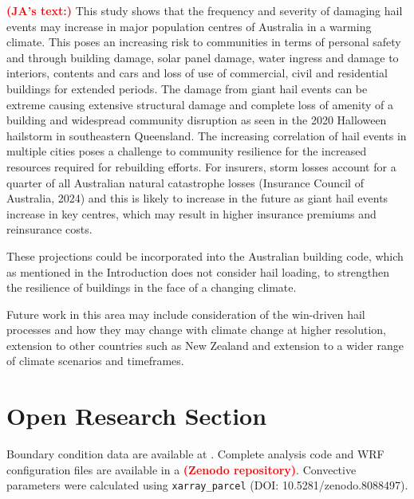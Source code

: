 \documentclass[]{agujournal2019}\usepackage[]{graphicx}\usepackage[]{xcolor}
\newcommand*{\todo}[1]{\textbf{\textcolor{red}{(#1)}}}
\begin{document}
\todo{JA's text:} This study shows that the frequency and severity of damaging
hail events may increase in major population centres of Australia in a warming
climate. This poses an increasing risk to communities in terms of personal
safety and through building damage, solar panel damage, water ingress and damage
to interiors, contents and cars and loss of use of commercial, civil and
residential buildings for extended periods. The damage from giant hail events
can be extreme causing extensive structural damage and complete loss of amenity
of a building and widespread community disruption as seen in the 2020 Halloween
hailstorm in southeastern Queensland. The increasing correlation of hail events
in multiple cities poses a challenge to community resilience for the increased
resources required for rebuilding efforts. For insurers, storm losses account
for a quarter of all Australian natural catastrophe losses (Insurance Council of
Australia, 2024) and this is likely to increase in the future as giant hail
events increase in key centres, which may result in higher insurance premiums
and reinsurance costs.

These projections could be incorporated into the Australian building code, which
as mentioned in the Introduction does not consider hail loading, to strengthen
the resilience of buildings in the face of a changing climate. 

Future work in this area may include consideration of the win-driven hail
processes and how they may change with climate change at higher resolution,
extension to other countries such as New Zealand and extension to a wider range
of climate scenarios and timeframes.

\section*{Open Research Section}

Boundary condition data are available at . Complete
analysis code and WRF configuration files are available in a \todo{Zenodo
repository}. Convective parameters were calculated using \texttt{xarray\_parcel}
(DOI: 10.5281/zenodo.8088497).

\end{document}
